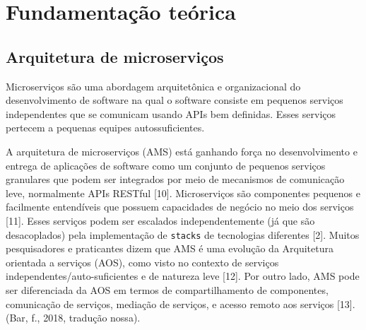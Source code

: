 \chapter{Fundamentação teórica}\label{cap_exemplos}


\section{Arquitetura de microserviços}

Microserviços são uma abordagem arquitetônica e organizacional do desenvolvimento de software na qual o software consiste em pequenos serviços independentes que se comunicam usando APIs bem definidas. Esses serviços pertecem a pequenas equipes autossuficientes.

A arquitetura de microserviços (AMS) está ganhando força no desenvolvimento e entrega de aplicações de software como um conjunto de pequenos serviços granulares que podem ser integrados por meio de mecanismos de comunicação leve, normalmente APIs RESTful [10]. Microserviços são componentes pequenos e facilmente entendíveis que possuem capacidades de negócio no meio dos serviços [11]. Esses serviços podem ser escalados independentemente (já que são desacoplados) pela implementação de \texttt{stacks} de tecnologias diferentes [2]. Muitos pesquisadores e praticantes dizem que AMS é uma evolução da Arquitetura orientada a serviços (AOS), como visto no contexto de serviços independentes/auto-suficientes e de natureza leve [12]. Por outro lado, AMS pode ser diferenciada da AOS em termos de compartilhamento de componentes, comunicação de serviços, mediação de serviços, e acesso remoto aos serviços [13]. (Bar, f., 2018, tradução nossa).

